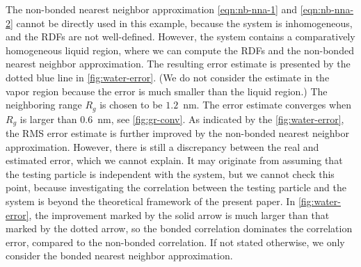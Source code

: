 \documentclass[journal=jacsat,manuscript=article]{achemso}
\begin{document}
{  The non-bonded nearest
  neighbor approximation \ref{eqn:nb-nna-1} and \ref{eqn:nb-nna-2}
  cannot be directly used  in this example, 
  because the system is inhomogeneous, and the RDFs are not well-defined.
  However, the system contains a comparatively homogeneous liquid region,
  where we can compute the RDFs and the non-bonded
  nearest neighbor
  approximation. The resulting error estimate is presented by the
  dotted blue line in \ref{fig:water-error}.
  (We do not consider the estimate in the vapor region because
  the error is much smaller than the liquid region.)
  The neighboring range $R_g$ is chosen to be $1.2$~\textsf{nm}.
  The error estimate converges
  when $R_g$
  is larger than $0.6$~\textsf{nm},
  see \ref{fig:gr-conv}.
  As indicated by the \ref{fig:water-error},
  the RMS error estimate is further improved by the non-bonded
  nearest neighbor approximation.
  However, there is still a discrepancy between the real and estimated
  error, which we cannot explain. It may originate from 
  assuming that the testing particle is independent with the system, but
  we cannot check this point, because investigating the
  correlation between the testing
  particle and the system is beyond the theoretical framework of the
  present paper.
  In \ref{fig:water-error}, the improvement marked by the solid
  arrow is much larger than that marked by the dotted arrow,
  so the bonded correlation dominates the correlation error, compared to
  the non-bonded correlation.
  If not stated otherwise,
  we only consider the bonded nearest neighbor approximation.}

\end{document}
